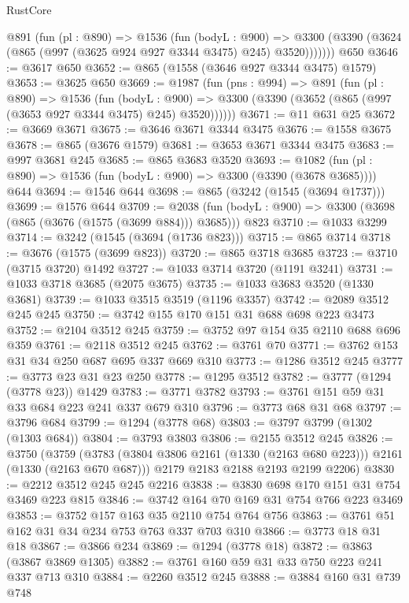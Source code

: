 \begin{lexlean}{RustCore}
\begin{coremodule}
{\begin{coremodule}
{{{{{{{{      @891
        (fun (pl : @890) =>
        @1536
          (fun (bodyL : @900) =>
          @3300 (@3390 (@3624 (@865 (@997 (@3625 @924 @927 @3344 @3475) @245) @3520)))))))
    @650
@3646 := @3617 @650
@3652 := @865 (@1558 (@3646 @927 @3344 @3475) @1579)
@3653 := @3625 @650
@3669 := @1987
    (fun (pns : @994) =>
    @891
      (fun (pl : @890) =>
      @1536
        (fun (bodyL : @900) =>
        @3300 (@3390 (@3652 (@865 (@997 (@3653 @927 @3344 @3475) @245) @3520))))))
@3671 := @11 @631 @25
@3672 := @3669 @3671
@3675 := @3646 @3671 @3344 @3475
@3676 := @1558 @3675
@3678 := @865 (@3676 @1579)
@3681 := @3653 @3671 @3344 @3475
@3683 := @997 @3681 @245
@3685 := @865 @3683 @3520
@3693 := @1082 (fun (pl : @890) => @1536 (fun (bodyL : @900) => @3300 (@3390 (@3678 @3685)))) @644
@3694 := @1546 @644
@3698 := @865 (@3242 (@1545 (@3694 @1737)))
@3699 := @1576 @644
@3709 := @2038 (fun (bodyL : @900) => @3300 (@3698 (@865 (@3676 (@1575 (@3699 @884))) @3685))) @823
@3710 := @1033 @3299
@3714 := @3242 (@1545 (@3694 (@1736 @823)))
@3715 := @865 @3714
@3718 := @3676 (@1575 (@3699 @823))
@3720 := @865 @3718 @3685
@3723 := @3710 (@3715 @3720) @1492
@3727 := @1033 @3714 @3720 (@1191 @3241)
@3731 := @1033 @3718 @3685 (@2075 @3675)
@3735 := @1033 @3683 @3520 (@1330 @3681)
@3739 := @1033 @3515 @3519 (@1196 @3357)
@3742 := @2089 @3512 @245 @245
@3750 := @3742 @155 @170 @151 @31 @688 @698 @223 @3473
@3752 := @2104 @3512 @245
@3759 := @3752 @97 @154 @35 @2110 @688 @696 @359
@3761 := @2118 @3512 @245
@3762 := @3761 @70
@3771 := @3762 @153 @31 @34 @250 @687 @695 @337 @669 @310
@3773 := @1286 @3512 @245
@3777 := @3773 @23 @31 @23 @250
@3778 := @1295 @3512
@3782 := @3777 (@1294 (@3778 @23)) @1429
@3783 := @3771 @3782
@3793 := @3761 @151 @59 @31 @33 @684 @223 @241 @337 @679 @310
@3796 := @3773 @68 @31 @68
@3797 := @3796 @684
@3799 := @1294 (@3778 @68)
@3803 := @3797 @3799 (@1302 (@1303 @684))
@3804 := @3793 @3803
@3806 := @2155 @3512 @245
@3826 := @3750
    (@3759
      (@3783 (@3804 @3806 @2161 (@1330 (@2163 @680 @223))) @2161 (@1330 (@2163 @670 @687)))
      @2179
      @2183
      @2188
      @2193
      @2199
      @2206)
@3830 := @2212 @3512 @245 @245 @2216
@3838 := @3830 @698 @170 @151 @31 @754 @3469 @223 @815
@3846 := @3742 @164 @70 @169 @31 @754 @766 @223 @3469
@3853 := @3752 @157 @163 @35 @2110 @754 @764 @756
@3863 := @3761 @51 @162 @31 @34 @234 @753 @763 @337 @703 @310
@3866 := @3773 @18 @31 @18
@3867 := @3866 @234
@3869 := @1294 (@3778 @18)
@3872 := @3863 (@3867 @3869 @1305)
@3882 := @3761 @160 @59 @31 @33 @750 @223 @241 @337 @713 @310
@3884 := @2260 @3512 @245
@3888 := @3884 @160 @31 @739 @748
}}}}}}}}
\end{coremodule}}
\end{coremodule}
\end{lexlean}
